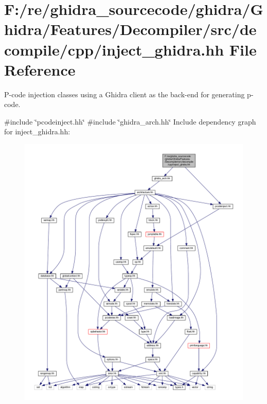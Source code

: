 \hypertarget{inject__ghidra_8hh}{}\section{F\+:/re/ghidra\+\_\+sourcecode/ghidra/\+Ghidra/\+Features/\+Decompiler/src/decompile/cpp/inject\+\_\+ghidra.hh File Reference}
\label{inject__ghidra_8hh}


P-\/code injection classes using a Ghidra client as the back-\/end for generating p-\/code.  


{\ttfamily \#include \char`\"{}pcodeinject.\+hh\char`\"{}}\newline
{\ttfamily \#include \char`\"{}ghidra\+\_\+arch.\+hh\char`\"{}}\newline
Include dependency graph for inject\+\_\+ghidra.\+hh\+:
\nopagebreak
\begin{figure}[H]
\begin{center}
\leavevmode
\includegraphics[width=350pt]{inject__ghidra_8hh__incl}
\end{center}
\end{figure}
